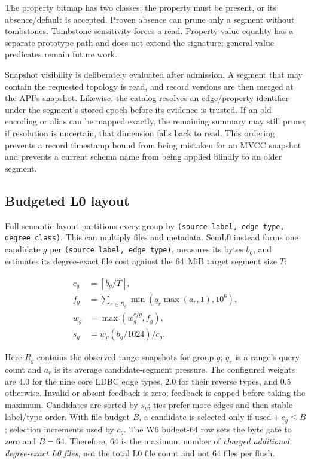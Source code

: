 \documentclass[sigconf,screen]{cidr-2027}
\newcommand{\sys}{SemL0\xspace}
\begin{document}
The property bitmap has two classes: the property must be present, or its
absence/default is accepted. Proven absence can prune only a segment without
tombstones. Tombstone sensitivity forces a read. Property-value equality has a
separate prototype path and does not extend the signature; general value
predicates remain future work.

Snapshot visibility is deliberately evaluated after admission. A segment that
may contain the requested topology is read, and record versions are then
merged at the API's snapshot. Likewise, the catalog resolves an edge/property
identifier under the segment's stored epoch before its evidence is trusted.
If an old encoding or alias can be mapped exactly, the remaining summary may
still prune; if resolution is uncertain, that dimension falls back to read.
This ordering prevents a record timestamp bound from being mistaken for an
MVCC snapshot and prevents a current schema name from being applied blindly to
an older segment.

\subsection{Budgeted L0 layout}

Full semantic layout partitions every group by
\texttt{(source label, edge type, degree class)}. This can multiply files and
metadata. \sys instead forms one candidate $g$ per
\texttt{(source label, edge type)}, measures its bytes $b_g$, and estimates its
degree-exact file cost against the 64~MiB target segment size $T$:

\begin{equation}
\begin{aligned}
c_g &= \left\lceil b_g/T \right\rceil, \\
f_g &= \sum_{r\in R_g}\min(q_r\max(a_r,1),10^6), \\
w_g &= \max(w_g^{cfg},f_g), \\
s_g &= w_g(b_g/1024)/c_g .
\end{aligned}
\label{eq:budget}
\end{equation}

Here $R_g$ contains the observed range snapshots for group $g$; $q_r$ is a
range's query count and $a_r$ is its average candidate-segment pressure. The
configured weights are 4.0 for the nine core LDBC edge types,
2.0 for their reverse types, and 0.5 otherwise. Invalid or absent feedback is
zero; feedback is capped before taking the maximum. Candidates are sorted by
$s_g$; ties prefer more edges and then stable label/type order. With file budget $B$, a candidate is selected only if
$\mathrm{used}+c_g\le B$; selection increments $\mathrm{used}$ by $c_g$.
The W6 budget-64 row sets the byte gate to zero and $B=64$. Therefore, 64 is
the maximum number of \emph{charged additional degree-exact L0 files}, not the
total L0 file count and not 64 files per flush.
\end{document}
